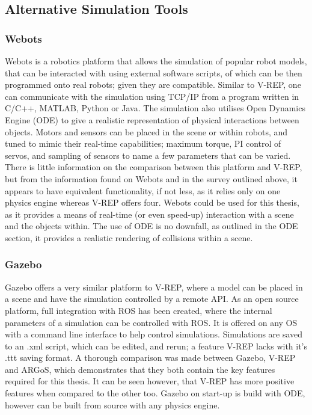 \documentclass[12pt,openany,a4paper]{book}
\begin{document}
\subsection{Alternative Simulation Tools}

\subsubsection{Webots}
Webots is a robotics platform that allows the simulation of popular robot models, that can be interacted with using external software scripts, of which can be then programmed onto real robots; given they are compatible. Similar to V-REP, one can communicate with the simulation using TCP/IP from a program written in C/C++, MATLAB, Python or Java. The simulation also utilises Open Dynamics Engine (ODE) to give a realistic representation of physical interactions between objects. Motors and sensors can be placed in the scene or within robots, and tuned to mimic their real-time capabilities; maximum torque, PI control of servos, and sampling of sensors to name a few parameters that can be varied. There is little information on the comparison between this platform and V-REP, but from the information found on Webots and in the survey outlined above, it appears to have equivalent functionality, if not less, as it relies only on one physics engine whereas V-REP offers four.
Webots could be used for this thesis, as it provides a means of real-time (or even speed-up) interaction with a scene and the objects within. The use of ODE is no downfall, as outlined in the ODE section, it provides a realistic rendering of collisions within a scene.

\subsubsection{Gazebo}
Gazebo offers a very similar platform to V-REP, where a model can be placed in a scene and have the simulation controlled by a remote API. As an open source platform, full integration with ROS has been created, where the internal parameters of a simulation can be controlled with ROS. It is offered on any OS with a command line interface to help control simulations. Simulations are saved to an .xml script, which can be edited, and rerun; a feature V-REP lacks with it's .ttt saving format. A thorough comparison was made between Gazebo, V-REP and ARGoS, which demonstrates that they both contain the key features required for this thesis. It can be seen however, that V-REP has more positive features when compared to the other too. Gazebo on start-up is build with ODE, however can be built from source with any physics engine.
\end{document}
